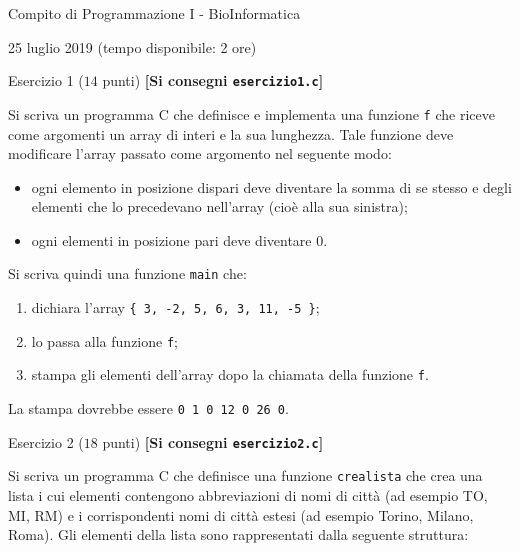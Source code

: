 \documentclass[12pt]{article}
\begin{document}
\begin{center}{\LARGE Compito di Programmazione I - BioInformatica}\\
\vspace*{-2ex}
\begin{center}
  \large 25 luglio 2019 (tempo disponibile: 2 ore)
\end{center}
\end{center}

\vspace*{1ex}
\begin{center}{\Large Esercizio 1} ($14$ punti) \textbf{[Si consegni \texttt{esercizio1.c}]}\end{center}

Si scriva un programma C che definisce e implementa una funzione \texttt{f} che riceve come
argomenti un array di interi e la sua lunghezza. Tale funzione deve modificare l'array passato
come argomento nel seguente modo:

\begin{itemize}
\item ogni elemento in posizione dispari deve diventare la somma di se stesso e degli elementi
  che lo precedevano nell'array (cio\`e alla sua sinistra);
\item ogni elementi in posizione pari deve diventare 0.
\end{itemize}

Si scriva quindi una funzione \texttt{main} che:

\begin{enumerate}
\item dichiara l'array \texttt{\{ 3, -2, 5, 6, 3, 11, -5 \}};
\item lo passa alla funzione \texttt{f};
\item stampa gli elementi dell'array dopo la chiamata della funzione \texttt{f}.
\end{enumerate}

La stampa dovrebbe essere \texttt{0 1 0 12 0 26 0}.

\begin{center}{\Large Esercizio 2} ($18$ punti) \textbf{[Si consegni \texttt{esercizio2.c}]}\end{center}
Si scriva un programma C che definisce una funzione \texttt{crealista} che crea una  lista i cui elementi contengono abbreviazioni di nomi di citt\`a (ad esempio TO, MI,
RM) e i corrispondenti nomi di citt\`a estesi (ad esempio Torino, Milano, Roma). Gli elementi della lista sono rappresentati
dalla seguente struttura: 
\end{document}
